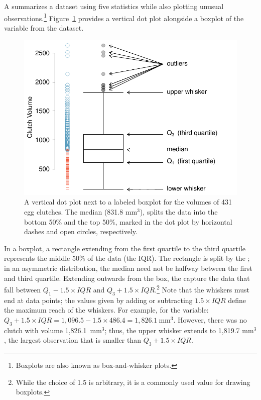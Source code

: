 \begin{doublespace}
A  summarizes a dataset using five statistics while also plotting unusual observations.\footnote{Boxplots are also known as box-and-whisker plots.} Figure~\ref{frogBoxPlot} provides a vertical dot plot alongside a boxplot of the  variable from the  dataset. 

\begin{figure}[th]
	\centering
	\includegraphics[width=0.86\mycaptionwidth]{ch_intro_to_data_oi_biostat/figures/frogBoxPlot/frogBoxPlot}
	\caption{A vertical dot plot next to a labeled boxplot for the volumes of 431 egg clutches. The median (831.8 $\textrm {mm}^{3}$), splits the data into the bottom 50\% and the top 50\%, marked in the dot plot by horizontal dashes and open circles, respectively.}
	\label{frogBoxPlot}
\end{figure}

In a boxplot, a rectangle extending from the first quartile to the third quartile represents the middle 50\% of the data (the IQR). The rectangle is split by the ; in an asymmetric distribution, the median need not be halfway between the first and third quartile. Extending outwards from the box, the  capture the data that fall between $Q_1 - 1.5\times IQR$ and $Q_3 + 1.5\times IQR$.\footnote{While the choice of 1.5 is arbitrary, it is a commonly used value for drawing boxplots.} Note that the whiskers must end at data points; the values given by adding or subtracting $1.5\times IQR$ define the maximum reach of the whiskers. For example, for the  variable: $Q_3 + 1.5\times IQR = 1,096.5 - 1.5\times 486.4 = 1,826.1\ \textrm {mm}^{3}$. However, there was no clutch with volume 1,826.1\ $\textrm {mm}^{3}$; thus, the upper whisker extends to 1,819.7 $\textrm {mm}^{3}$, the largest observation that is smaller than $Q_3 + 1.5\times IQR$.


\end{doublespace}
